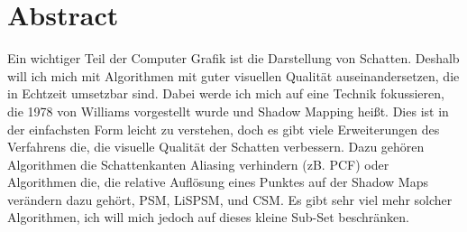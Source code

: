 \documentclass{thesisclass}
\let\cleardoublepage\clearpage
\begin{document}

\frontmatter
{}

\blankpage

\chapter*{Abstract}
Ein wichtiger Teil der Computer Grafik ist die Darstellung von Schatten.
Deshalb will ich mich mit Algorithmen mit guter visuellen Qualität auseinandersetzen,
die in Echtzeit umsetzbar sind.
Dabei werde ich mich auf eine Technik fokussieren, die 1978 von Williams vorgestellt wurde und \glqq{}Shadow Mapping\grqq{} heißt.
Dies ist in der einfachsten Form leicht zu verstehen, doch es gibt viele 
Erweiterungen des Verfahrens die, die visuelle Qualität 
der Schatten verbessern. 
Dazu gehören Algorithmen die Schattenkanten Aliasing verhindern (zB. PCF) oder 
Algorithmen die, die relative Auflösung eines Punktes auf der Shadow Maps verändern dazu gehört, 
PSM, LiSPSM, und CSM. Es gibt sehr viel mehr solcher Algorithmen, ich will mich jedoch auf dieses kleine Sub-Set beschränken.

%
%


\tableofcontents
\blankpage

\mainmatter
{}




\cleardoublepage
{}
{}

{}	%
{}	%
												  



\end{document}

